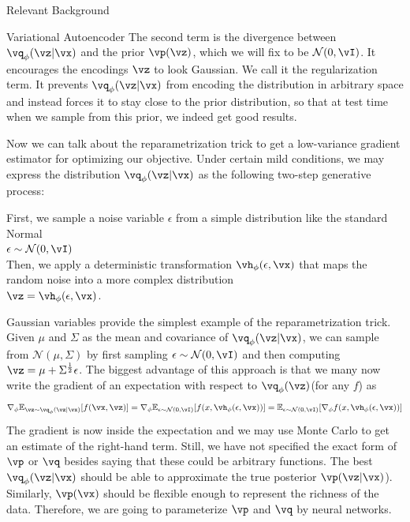 \documentclass{article}
\begin{document}
\begin{psection}{Relevant Background}
\begin{psubsection}{Variational Autoencoder}
    The second term is the divergence between $\vq_\phi(\vz|\vx)$ and the prior $\vp(\vz)$, which we will fix to be $\mathcal{N}(0,\vI)$. It encourages the encodings $\vz$ to look Gaussian. We call it the regularization term. It prevents $\vq_\phi(\vz|\vx)$ from encoding the distribution in arbitrary space and instead forces it to stay close to the prior distribution, so that at test time when we sample from this prior, we indeed get good results.
    
    Now we can talk about the reparametrization trick to get a low-variance gradient estimator for optimizing our objective. Under certain mild conditions, we may express the distribution $\vq_\phi(\vz|\vx)$ as the following two-step generative process:
    \begin{center}
        First, we sample a noise variable $\epsilon$ from a simple distribution like the standard Normal\\ $\epsilon\sim\mathcal{N}(0,\vI)$\\
        Then, we apply a deterministic transformation $\vh_\phi(\epsilon,\vx)$ that maps the random noise into a more complex distribution\\
        $\vz=\vh_\phi(\epsilon,\vx)$.
    \end{center}
    Gaussian variables provide the simplest example of the reparametrization trick. Given $\mu$ and $\Sigma$ as the mean and covariance of $\vq_\phi(\vz|\vx)$, we can sample from $\mathcal{N}(\mu,\Sigma)$ by first sampling  $\epsilon\sim\mathcal{N}(0,\vI)$ and then computing $\vz=\mu+\Sigma^{\frac{1}{2}}\epsilon$. The biggest advantage of this approach is that we many now write the gradient of an expectation with respect to $\vq_\phi(\vz)$(for any $f$) as
    \begin{align*}
        \nabla_\phi \mathbb{E}_{\vz\sim\vq_\phi(\vz|\vx)} [f(\vx,\vz)] = \nabla_\phi \mathbb{E}_{\epsilon\sim\mathcal{N}(0,\vI)}[f(x,\vh_\phi(\epsilon,\vx))] = \mathbb{E}_{\epsilon\sim\mathcal{N}(0,\vI)}[\nabla_\phi f(x,\vh_\phi(\epsilon,\vx))]
    \end{align*}
    The gradient is now inside the expectation and we may use Monte Carlo to get an estimate of the right-hand term. Still, we have not specified the exact form of $\vp$ or $\vq$ besides saying that these could be arbitrary functions. The best $\vq_\phi(\vz|\vx)$ should be able to approximate the true posterior $\vp(\vz|\vx)$). Similarly, $\vp(\vx)$ should be flexible enough to represent the richness of the data. Therefore, we are going to parameterize $\vp$ and $\vq$ by neural networks.
\end{psubsection}
\end{psection}
\end{document}
